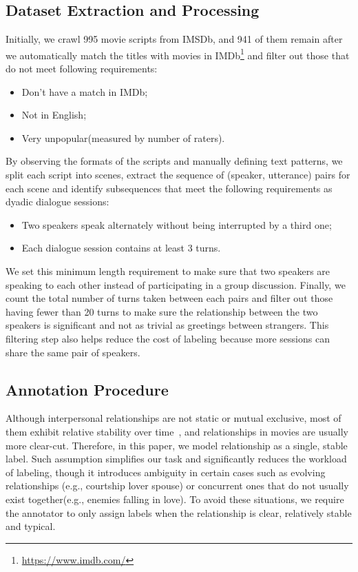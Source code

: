 \documentclass[letterpaper]{article} \usepackage{aaai21}  \usepackage{times}  \usepackage{helvet} \usepackage{courier}  \usepackage[hyphens]{url}  \usepackage{graphicx} \usepackage{xcolor}
\begin{document}
\subsection{Dataset Extraction and Processing}
Initially, we crawl 995 movie scripts from IMSDb, and 941 of them remain after we automatically match the titles with movies in IMDb\footnote{\url{https://www.imdb.com/}} and filter out those that do not meet following requirements:
\begin{itemize}
	\item Don't have a match in IMDb; 
	\item Not in English; 
	\item Very unpopular(measured by number of raters). 
\end{itemize}

By observing the formats of the scripts and manually defining text patterns, 
we split each script into scenes, extract the sequence of (speaker, utterance) 
pairs for each scene and identify subsequences that meet the following requirements  
as dyadic dialogue sessions: 
\begin{itemize}
	\item Two speakers speak alternately without being interrupted by a third one; 
	\item Each dialogue session contains at least 3 turns. 
\end{itemize}

We set this minimum length requirement to make sure that two speakers are speaking to each other instead of participating in a group discussion. Finally, we count the total number of turns taken between each pairs and filter out those having fewer than 20 turns to make sure the relationship between the two speakers is significant and not as trivial as greetings between strangers. This filtering step also helps reduce the cost of labeling because more sessions can share the same pair of speakers.

\subsection{Annotation Procedure}
Although interpersonal relationships are not static or mutual exclusive, most of them exhibit relative stability over time~\cite{gadde1987stability}, and relationships in movies are usually more clear-cut. Therefore, in this paper, we model relationship as a single, stable label. Such assumption simplifies our task and significantly reduces the workload of labeling, though it introduces 
ambiguity in certain cases such as evolving relationships (e.g., courtship  lover  spouse) or concurrent ones that do not usually exist together(e.g., enemies falling in love). To avoid these situations, we require the annotator to only assign labels when the relationship is clear, relatively stable and typical.
\end{document}
